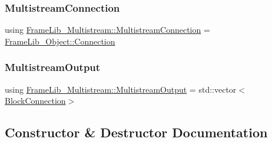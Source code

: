 \subsubsection{\texorpdfstring{Multistream\+Connection}{MultistreamConnection}}
{\footnotesize\ttfamily using \hyperlink{class_frame_lib___multistream_ab8c2c075b15353a370d386f546e51bb6}{Frame\+Lib\+\_\+\+Multistream\+::\+Multistream\+Connection} =  \hyperlink{struct_frame_lib___object_1_1_connection}{Frame\+Lib\+\_\+\+Object\+::\+Connection}\hspace{0.3cm}{\ttfamily [protected]}}

\mbox{\label{class_frame_lib___multistream_a8844d112881e04687989f697a9337b11}} 
\subsubsection{\texorpdfstring{Multistream\+Output}{MultistreamOutput}}
{\footnotesize\ttfamily using \hyperlink{class_frame_lib___multistream_a8844d112881e04687989f697a9337b11}{Frame\+Lib\+\_\+\+Multistream\+::\+Multistream\+Output} =  std\+::vector$<$\hyperlink{class_frame_lib___multistream_a611f70443aaa3eb2205f578c0882c469}{Block\+Connection}$>$\hspace{0.3cm}{\ttfamily [protected]}}



\subsection{Constructor \& Destructor Documentation}
\mbox{\label{class_frame_lib___multistream_afcaf1841d86c9fe33c88770b504e3f5f}} 

